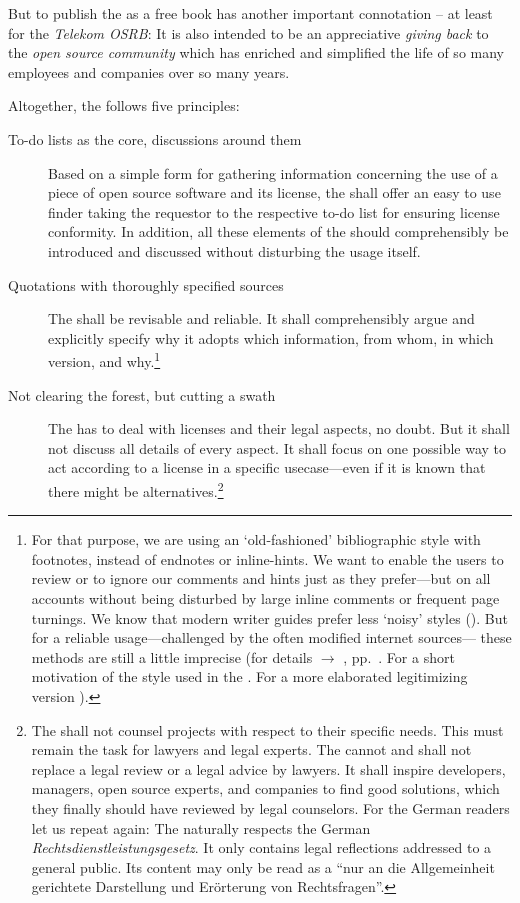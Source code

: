 But to publish the \emph{\oslic} as a free book has another important connotation --
at least for the \emph{Telekom OSRB}: It is also intended to be an appreciative
\emph{giving back} to the \emph{open source community} which has enriched and
simplified the life of so many employees and companies over so many years.

Altogether, the \oslic{} follows five principles:

\begin{description}
  \item[To-do lists as the core, discussions around them] Based on a simple
  form for gathering information concerning the use of a piece of open
  source software and its license, the \oslic{} shall offer an easy to use finder
  taking the requestor to the respective to-do list for ensuring license
  conformity. In addition, all these elements of the \oslic{} should comprehensibly
  be introduced and discussed without disturbing the usage itself.

  \item[Quotations with thoroughly specified sources]\label{QuotationPrinciple}
  The \oslic{} shall be revisable and reliable. It shall comprehensibly argue and
  explicitly specify why it adopts which information, from whom, in which
  version, and why.\footnote{For that purpose, we are using an `old-fashioned'
  bibliographic style with footnotes, instead of endnotes or inline-hints.
  We want to enable the users to review or to ignore our comments and hints just
  as they prefer---but on all accounts without being disturbed by large inline
  comments or frequent page turnings. We know that modern writer guides prefer
  less `noisy' styles (\cite[pars pro toto cf.][\nopage passim]{Mla2009a}). But
  for a reliable usage---challenged by the often modified internet sources---%
  these methods are still a little imprecise (for details $\rightarrow$ \oslic,
  pp.\ \pageref{sec:QuotationAppendix}. For a short motivation of the style used
  in the \oslic{} \cite[cf.][\nopage passim]{Reincke2012a}. For a more elaborated
  legitimizing version \cite[cf.][\nopage passim]{Reincke2012b}).}

  \item[Not clearing the forest, but cutting a swath] The \oslic{} has to deal with
  licenses and their legal aspects, no doubt. But it shall not discuss all
  details of every aspect. It shall focus on one possible way to act according
  to a license in a specific usecase---even if it is known that there might be
  alternatives.\footnote{The \oslic{} shall not counsel projects with respect to
  their specific needs. This must remain the task for lawyers and legal experts.
  The \oslic{} cannot and shall not replace a legal review or a legal advice by
  lawyers. It shall inspire developers, managers, open source experts, and
  companies to find good solutions, which they finally should have reviewed by
  legal counselors. For the German readers let us repeat again: The
  \oslic{} naturally respects the German \emph{Rechtsdienstleistungsgesetz}. It only
  contains legal reflections addressed to a general public. Its content may only
  be read as a \enquote{nur an die Allgemeinheit gerichtete Darstellung und
  Erörterung von Rechtsfragen}.}
  

\end{description}
